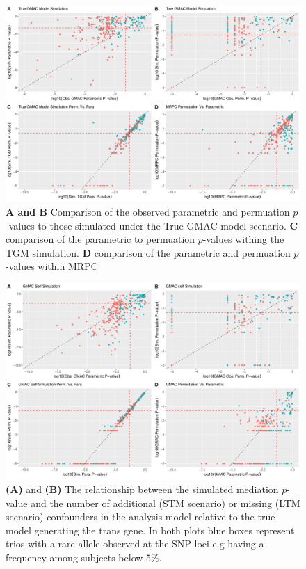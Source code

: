 \documentclass[
]{article}
\begin{document}
\begin{figure}
\centering
\includegraphics{GMACwriteup2_files/figure-latex/unnamed-chunk-3-1.pdf}
\caption{\textbf{A and B} Comparison of the observed parametric and
permuation \(p\)-values to those simulated under the True GMAC model
scenario. \textbf{C} comparison of the parametric to permuation
\(p\)-values withing the TGM simulation. \textbf{D} comparison of the
parametric and permuation \(p\)-values within MRPC}
\end{figure}

\begin{figure}
\centering
\includegraphics{GMACwriteup2_files/figure-latex/unnamed-chunk-4-1.pdf}
\caption{\textbf{(A)} and \textbf{(B)} The relationship between the
simulated mediation \(p\)-value and the number of additional (STM
scenario) or missing (LTM scenario) confounders in the analysis model
relative to the true model generating the trans gene. In both plots blue
boxes represent trios with a rare allele observed at the SNP loci e.g
having a frequency among subjects below \(5\%\).}
\end{figure}
\end{document}
